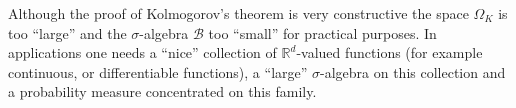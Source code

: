 \begin{remark*}
Although the proof of Kolmogorov's theorem is very constructive the
space $\Omega_{K}$ is too ``large'' and the $\sigma$-algebra
$\mathscr{B}$ too ``small'' for practical purposes. In applications
one needs a ``nice'' collection of $\mathbb{R}^{d}$-valued functions
(for example continuous, or differentiable functions), a ``large''
$\sigma$-algebra on this collection and a probability measure
concentrated on this family.
\end{remark*}




